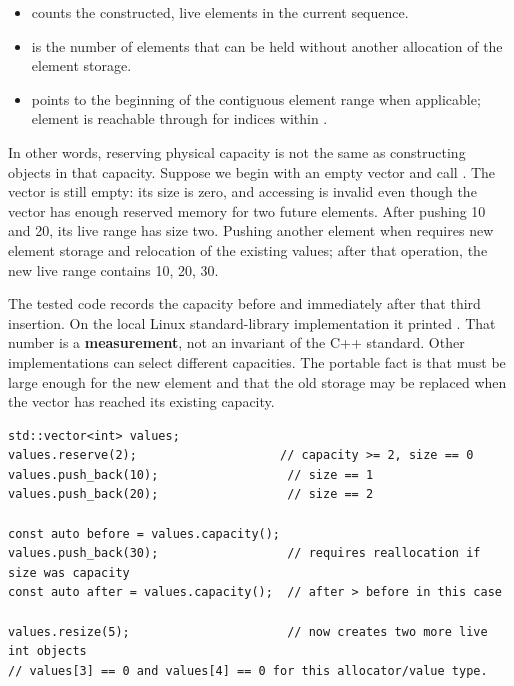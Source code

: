 \begin{itemize}
\tightlist
\item
   counts the constructed, live elements in the current sequence.
\item
   is the number of elements that can be held without another allocation of the element storage.
\item
   points to the beginning of the contiguous element range when applicable; element  is reachable through  for indices within \BookInlineCode{{{[}}{0}{,}{s}{i}{z}{e}{(}{)}{)}}{{[}0,size())}.
\end{itemize}

In other words, reserving physical capacity is not the same as constructing objects in that capacity. Suppose we begin with an empty vector and call . The vector is still empty: its size is zero, and accessing  is invalid even though the vector has enough reserved memory for two future  elements. After pushing 10 and 20, its live range has size two. Pushing another element when  requires new element storage and relocation of the existing values; after that operation, the new live range contains 10, 20, 30.

The tested code records the capacity before and immediately after that third insertion. On the local Linux standard-library implementation it printed . That number is a \textbf{measurement}, not an invariant of the C++ standard. Other implementations can select different capacities. The portable fact is that  must be large enough for the new element and that the old storage may be replaced when the vector has reached its existing capacity.

\begin{verbatim}
std::vector<int> values;
values.reserve(2);                    // capacity >= 2, size == 0
values.push_back(10);                  // size == 1
values.push_back(20);                  // size == 2

const auto before = values.capacity();
values.push_back(30);                  // requires reallocation if size was capacity
const auto after = values.capacity();  // after > before in this case

values.resize(5);                      // now creates two more live int objects
// values[3] == 0 and values[4] == 0 for this allocator/value type.
\end{verbatim}

